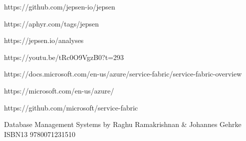 \begin{thebibliography}{9}
https://github.com/jepsen-io/jepsen 

https://aphyr.com/tags/jepsen 

https://jepsen.io/analyses 

https://youtu.be/tRc0O9VgzB0?t=293

https://docs.microsoft.com/en-us/azure/service-fabric/service-fabric-overview  

https://microsoft.com/en-us/azure/ 

https://github.com/microsoft/service-fabric  

Database Management Systems by Raghu Ramakrishnan \& Johannes Gehrke  ISBN13 9780071231510

\end{thebibliography}
